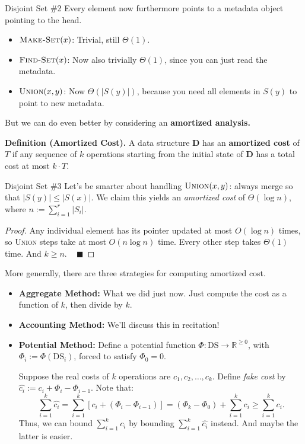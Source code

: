 \begin{solution}{Disjoint Set \#2}
    Every element now furthermore points to a metadata object pointing to the head.
    \begin{itemize}
        \item $\textsc{Make-Set}(x)$: Trivial, still $\Theta(1)$.
        \item $\textsc{Find-Set}(x)$: Now also trivially $\Theta(1)$, since you can just read the metadata.
        \item $\textsc{Union}(x, y)$: Now $\Theta(|S(y)|)$, because you need all elements in $S(y)$ to point to new metadata.
    \end{itemize}
\end{solution}

But we can do even better by considering an \textbf{amortized analysis.}

\textbf{Definition (Amortized Cost).} A data structure $\mathbf{D}$ has an \textbf{amortized cost} of $T$ if any sequence of $k$ operations starting from the initial state of $\mathbf{D}$ has a total cost at most $k \cdot T$.

\begin{solution}{Disjoint Set \#3}
    Let's be smarter about handling $\textsc{Union}(x, y)$: always merge so that $|S(y)| \leq |S(x)|$.  We claim this yields an \emph{amortized cost} of $\Theta(\log n)$, where $n := \sum_{i = 1}^r |S_i|$.
\end{solution}

\begin{proof}
    Any individual element has its pointer updated at most $O(\log n)$ times, so \textsc{Union} steps take at most $O(n \log n)$ time.  Every other step takes $\Theta(1)$ time.  And $k \geq n$.  ~ $\blacksquare$
\end{proof}

More generally, there are three strategies for computing amortized cost.
\begin{itemize}
    \item \textbf{Aggregate Method:} What we did just now.  Just compute the cost as a function of $k$, then divide by $k$.
    \item \textbf{Accounting Method:} We'll discuss this in recitation!
    \item \textbf{Potential Method:} Define a potential function $\Phi: \text{DS} \to \mathbb{R}^{\geq 0}$, with $\Phi_i := \Phi(\text{DS}_i)$, forced to satisfy $\Phi_0 = 0$.

    Suppose the real costs of $k$ operations are $c_1, c_2, \dots, c_k$.  Define \emph{fake cost} by $\hat{c_i} := c_i + \Phi_i - \Phi_{i - 1}$.  Note that:
    \[ \sum_{i = 1}^k \hat{c_i} = \sum_{i = 1}^k \left [ c_i + (\Phi_i - \Phi_{i - 1}) \right ] = (\Phi_k - \Phi_0) + \sum_{i = 1}^k c_i \geq \sum_{i = 1}^k c_i. \]
    Thus, we can bound $\sum_{i = 1}^k c_i$ by bounding $\sum_{i = 1}^k \hat{c_i}$ instead.  And maybe the latter is easier.
\end{itemize}

